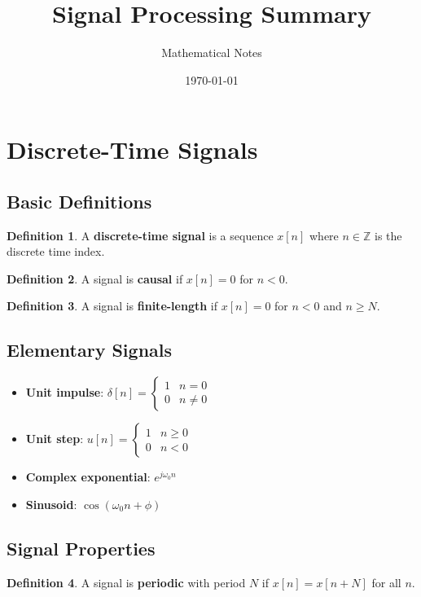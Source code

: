 \documentclass[11pt]{article}
\title{Signal Processing Summary}
\author{Mathematical Notes}
\date{\today}
\theoremstyle{definition}
\newtheorem{definition}{Definition}[section]
\begin{document}
\maketitle

\tableofcontents
\newpage

\section{Discrete-Time Signals}

\subsection{Basic Definitions}
\begin{definition}
A \textbf{discrete-time signal} is a sequence $x[n]$ where $n \in \mathbb{Z}$ is the discrete time index.
\end{definition}

\begin{definition}
A signal is \textbf{causal} if $x[n] = 0$ for $n < 0$.
\end{definition}

\begin{definition}
A signal is \textbf{finite-length} if $x[n] = 0$ for $n < 0$ and $n \geq N$.
\end{definition}

\subsection{Elementary Signals}
\begin{itemize}
    \item \textbf{Unit impulse}: $\delta[n] = \begin{cases} 1 & n = 0 \\ 0 & n \neq 0 \end{cases}$
    \item \textbf{Unit step}: $u[n] = \begin{cases} 1 & n \geq 0 \\ 0 & n < 0 \end{cases}$
    \item \textbf{Complex exponential}: $e^{j\omega_0 n}$
    \item \textbf{Sinusoid}: $\cos(\omega_0 n + \phi)$
\end{itemize}

\subsection{Signal Properties}
\begin{definition}
A signal is \textbf{periodic} with period $N$ if $x[n] = x[n + N]$ for all $n$.
\end{definition}
\end{document}
